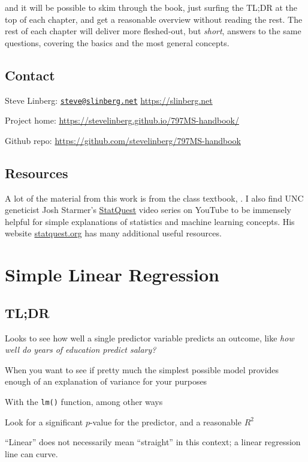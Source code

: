 \documentclass[
]{book}
\providecommand{\tightlist}{%
  \setlength{\itemsep}{0pt}\setlength{\parskip}{0pt}}
\begin{document}
and it will be possible to skim through the book, just surfing the TL;DR at the top of each chapter, and get a reasonable overview without reading the rest. The rest of each chapter will deliver more fleshed-out, but \emph{short}, answers to the same questions, covering the basics and the most general concepts.

\hypertarget{contact}{%
\section{Contact}\label{contact}}

Steve Linberg: \href{mailto:steve@slinberg.net}{\nolinkurl{steve@slinberg.net}} \textbar\textbar{} \url{https://slinberg.net}

Project home: \url{https://stevelinberg.github.io/797MS-handbook/}

Github repo: \url{https://github.com/stevelinberg/797MS-handbook}

\hypertarget{resources}{%
\section{Resources}\label{resources}}

A lot of the material from this work is from the class textbook, \citet{ISLR}. I also find UNC geneticist Josh Starmer's \href{https://www.youtube.com/channel/UCtYLUTtgS3k1Fg4y5tAhLbw}{StatQuest} video series on YouTube to be immensely helpful for simple explanations of statistics and machine learning concepts. His website \href{https://statquest.org}{statquest.org} has many additional useful resources.

\hypertarget{simple-linear-regression}{%
\chapter{Simple Linear Regression}\label{simple-linear-regression}}

\hypertarget{tldr}{%
\section{TL;DR}\label{tldr}}

\begin{description}
\tightlist
\item[What it does]
Looks to see how well a single predictor variable predicts an outcome, like \emph{how well do years of education predict salary?}
\item[When to do it]
When you want to see if pretty much the simplest possible model provides enough of an explanation of variance for your purposes
\item[How to do it]
With the \texttt{lm()} function, among other ways
\item[How to assess it]
Look for a significant \(p\)-value for the predictor, and a reasonable \(R^2\)
\item[Note]
``Linear'' does not necessarily mean ``straight'' in this context; a linear regression line can curve.
\end{description}
\end{document}
